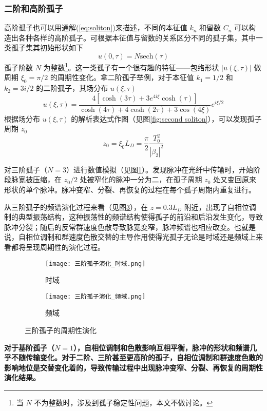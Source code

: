 \subsubsection{二阶和高阶孤子}
高阶孤子也可以用通解(\ref{eq:soliton})来描述，不同的本征值 $k_n$ 和留数 $C_n$ 可以构造出各种各样的高阶孤子。可根据本征值与留数的关系区分不同的孤子集，其中一类孤子集其初始形状如下
\begin{equation}
    u(0,\tau)=N\mathrm{sech}(\tau)
\end{equation}
孤子阶数 $N$ 为整数\footnote{当 $N$ 不为整数时，涉及到孤子稳定性问题，本文不做讨论。}。这一类孤子有一个很有趣的特征——包络形状 $|u(\xi,\tau)|$ 做周期 $\xi_0=\pi/2$ 的周期性变化。拿二阶孤子举例，对于本征值 $k_1=1/2$ 和 $k_2=3i/2$ 的二阶孤子，其场分布 $u(\xi,\tau)$
\begin{equation}
    u(\xi,\tau)=\frac{4[\cosh(3\tau)+3e^{4i\xi}\cosh(\tau)]}{\cosh(4\tau)+4\cosh(2\tau)+3\cos(4\xi)}e^{i\xi/2}
\end{equation}
根据场分布 $u(\xi,\tau)$ 的解析表达式作图（见图\ref{fig:second soliton}），可以发现孤子周期 $z_0$
\begin{equation}
    z_0=\xi_0L_D=\frac{\pi}{2}\frac{T^2_0}{|\beta_2|^2}
\end{equation}

对三阶孤子（$N=3$）进行数值模拟（见图\ref{fig:third soliton_time}）。发现脉冲在光纤中传输时，开始阶段脉宽被压缩，在 $z_0/2$ 处被窄化的脉冲一分为二，在孤子周期 $z_0$ 处又变回原来形状的单个脉冲。脉冲变窄、分裂、再恢复的过程在每个孤子周期内重复进行。

从三阶孤子的频谱演化过程来看（见图\ref{fig:third soliton_frequent}），在 $z=0.3L_D$ 附近，出现了自相位调制的典型振荡结构，这种振荡性的频谱结构使得孤子的前沿和后沿发生变化，导致脉冲分裂；随后的反常群速度色散导致脉宽变窄，脉冲频谱也相应改变。也就是说，自相位调制和群速度色散交替的主导作用使得光孤子无论是时域还是频域上来看都将呈现周期性的演化过程\cite{Agrawal}。
\begin{figure}[btp]
    \centering
    \begin{subfigure}[t]{0.45\linewidth}
        \begin{minipage}[b]{1\linewidth}
        \texttt{[image: 三阶孤子演化\_时域.png]}
        \caption{时域}
        \label{fig:third soliton_time}
        \end{minipage}
    \end{subfigure}
    \begin{subfigure}[t]{0.45\linewidth}
        \begin{minipage}[b]{1\linewidth}
        \texttt{[image: 三阶孤子演化\_频域.png]}
        \caption{频域}
        \label{fig:third soliton_frequent}    
        \end{minipage}
    \end{subfigure}
    \caption{三阶孤子的周期性演化}
\end{figure}

{\bfseries 对于基阶孤子（$N=1$），自相位调制和色散影响互相平衡，脉冲的形状和频谱几乎不随传输变化。对于二阶、三阶甚至更高阶的孤子，自相位调制和群速度色散的影响地位是交替变化着的，导致传输过程中出现脉冲变窄、分裂、再恢复的周期性演化结果\cite{Agrawal}。}